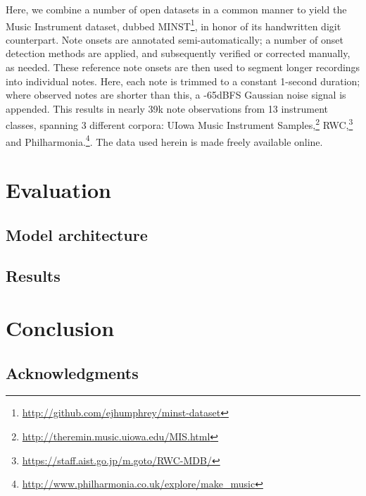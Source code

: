 \documentclass{article}
\begin{document}
Here, we combine a number of open datasets in a common manner to yield the Music Instrument dataset, dubbed MINST\footnote{\url{http://github.com/ejhumphrey/minst-dataset}}, in honor of its handwritten digit counterpart.
Note onsets are annotated semi-automatically;
a number of onset detection methods are applied, and subsequently verified or corrected manually, as needed.
These reference note onsets are then used to segment longer recordings into individual notes.
Here, each note is trimmed to a constant 1-second duration; where observed notes are shorter than this, a -65dBFS Gaussian noise signal is appended.
This results in nearly 39k note observations from 13 instrument classes, spanning 3 different corpora:
UIowa Music Instrument Samples,\footnote{\url{http://theremin.music.uiowa.edu/MIS.html}} RWC,\footnote{\url{https://staff.aist.go.jp/m.goto/RWC-MDB/}} and Philharmonia.\footnote{\url{http://www.philharmonia.co.uk/explore/make\_music}}.
The data used herein is made freely available online.


\section{Evaluation}



\subsection{Model architecture}

\subsection{Results}


\section{Conclusion}


\subsection*{Acknowledgments}



\end{document}
